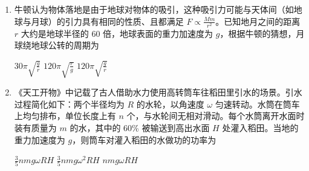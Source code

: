\documentclass[\gkver]{gaokaozhenti}
\begin{document}
\begin{enumerate}
{解得 $k = 100 \UNm$

故选 B。
}

\item
牛顿认为物体落地是由于地球对物体的吸引，这种吸引力可能与天体间（如地球与月球）的引力具有相同的性质、且都满足 $F \propto \frac{Mm}{r^{2}}$。已知地月之间的距离 $r$ 大约是地球半径的 60 倍，地球表面的重力加速度为 $g$，根据牛顿的猜想，月球绕地球公转的周期为

{$30\pi\sqrt{\frac{g}{r}}$}
{$120\pi\sqrt{\frac{r}{g}}$}
{$120\pi\sqrt{\frac{g}{r}}$}


\item
《天工开物》中记载了古人借助水力使用高转筒车往稻田里引水的场景。引水过程简化如下：两个半径均为 $R$ 的水轮，以角速度 $\omega$ 匀速转动。水筒在筒车上均匀排布，单位长度上有 $n$ 个，与水轮间无相对滑动。每个水筒离开水面时装有质量为 $m$ 的水，其中的 60\% 被输送到高出水面 $H$ 处灌入稻田。当地的重力加速度为 $g$，则筒车对灌入稻田的水做功的功率为


{$\frac{3}{5}nmg\omega RH$}
{$\frac{3}{5}nmg\omega^{2}RH$}
{$nmg\omega RH$}

\end{enumerate}
\end{document}
